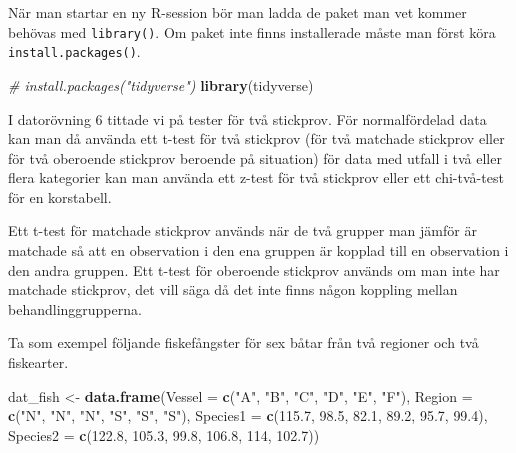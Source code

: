 \documentclass[
]{book}
\newenvironment{Shaded}{\begin{snugshade}}{\end{snugshade}}
\newcommand{\AttributeTok}[1]{\textcolor[rgb]{0.13,0.29,0.53}{#1}}
\newcommand{\CommentTok}[1]{\textcolor[rgb]{0.56,0.35,0.01}{\textit{#1}}}
\newcommand{\DecValTok}[1]{\textcolor[rgb]{0.00,0.00,0.81}{#1}}
\newcommand{\FloatTok}[1]{\textcolor[rgb]{0.00,0.00,0.81}{#1}}
\newcommand{\FunctionTok}[1]{\textcolor[rgb]{0.13,0.29,0.53}{\textbf{#1}}}
\newcommand{\NormalTok}[1]{#1}
\newcommand{\OtherTok}[1]{\textcolor[rgb]{0.56,0.35,0.01}{#1}}
\newcommand{\StringTok}[1]{\textcolor[rgb]{0.31,0.60,0.02}{#1}}
\theoremstyle{definition}
\theoremstyle{definition}
\theoremstyle{definition}
\theoremstyle{definition}
\theoremstyle{remark}
\begin{document}
När man startar en ny R-session bör man ladda de paket man vet kommer behövas med \texttt{library()}. Om paket inte finns installerade måste man först köra \texttt{install.packages()}.

\begin{Shaded}
\begin{Highlighting}[]
\CommentTok{\# install.packages("tidyverse")}
\FunctionTok{library}\NormalTok{(tidyverse)}
\end{Highlighting}
\end{Shaded}

I datorövning 6 tittade vi på tester för två stickprov. För normalfördelad data kan man då använda ett t-test för två stickprov (för två matchade stickprov eller för två oberoende stickprov beroende på situation) för data med utfall i två eller flera kategorier kan man använda ett z-test för två stickprov eller ett chi-två-test för en korstabell.

Ett t-test för matchade stickprov används när de två grupper man jämför är matchade så att en observation i den ena gruppen är kopplad till en observation i den andra gruppen. Ett t-test för oberoende stickprov används om man inte har matchade stickprov, det vill säga då det inte finns någon koppling mellan behandlinggrupperna.

Ta som exempel följande fiskefångster för sex båtar från två regioner och två fiskearter.

\begin{Shaded}
\begin{Highlighting}[]
\NormalTok{dat\_fish }\OtherTok{\textless{}{-}} \FunctionTok{data.frame}\NormalTok{(}\AttributeTok{Vessel =} \FunctionTok{c}\NormalTok{(}\StringTok{"A"}\NormalTok{, }\StringTok{"B"}\NormalTok{, }\StringTok{"C"}\NormalTok{, }\StringTok{"D"}\NormalTok{, }\StringTok{"E"}\NormalTok{, }\StringTok{"F"}\NormalTok{),}
                       \AttributeTok{Region =} \FunctionTok{c}\NormalTok{(}\StringTok{"N"}\NormalTok{, }\StringTok{"N"}\NormalTok{, }\StringTok{"N"}\NormalTok{, }\StringTok{"S"}\NormalTok{, }\StringTok{"S"}\NormalTok{, }\StringTok{"S"}\NormalTok{),}
                       \AttributeTok{Species1 =} \FunctionTok{c}\NormalTok{(}\FloatTok{115.7}\NormalTok{, }\FloatTok{98.5}\NormalTok{, }\FloatTok{82.1}\NormalTok{, }\FloatTok{89.2}\NormalTok{, }\FloatTok{95.7}\NormalTok{, }\FloatTok{99.4}\NormalTok{),}
                       \AttributeTok{Species2 =} \FunctionTok{c}\NormalTok{(}\FloatTok{122.8}\NormalTok{, }\FloatTok{105.3}\NormalTok{, }\FloatTok{99.8}\NormalTok{, }\FloatTok{106.8}\NormalTok{, }\DecValTok{114}\NormalTok{, }\FloatTok{102.7}\NormalTok{))}
\end{Highlighting}
\end{Shaded}
\end{document}
